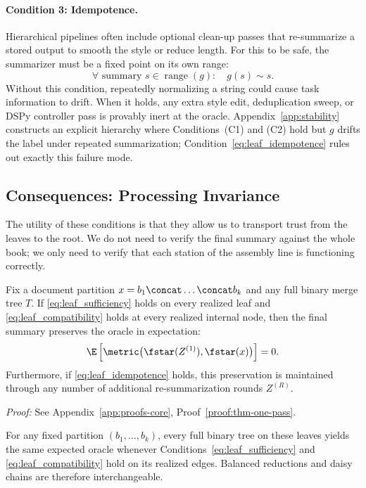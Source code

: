 \paragraph{Condition 3: Idempotence.}
Hierarchical pipelines often include optional clean-up passes that re-summarize a stored output to smooth the style or reduce length. For this to be safe, the summarizer must be a fixed point on its own range:
\begin{equation}\tag{C3}\label{eq:leaf_idempotence}
\forall \text{ summary } s \in \operatorname{range}(g):\quad g(s) \sim s.
\end{equation}
Without this condition, repeatedly normalizing a string could cause task information to drift. When it holds, any extra style edit, deduplication sweep, or DSPy controller pass is provably inert at the oracle. Appendix~\ref{app:stability} constructs an explicit hierarchy where Conditions~(C1) and (C2) hold but $g$ drifts the label under repeated summarization; Condition~\eqref{eq:leaf_idempotence} rules out exactly this failure mode.

\subsection{Consequences: Processing Invariance}

The utility of these conditions is that they allow us to transport trust from the leaves to the root. We do not need to verify the final summary against the whole book; we only need to verify that each station of the assembly line is functioning correctly.

\begin{theorem}\label{thm:one-pass}
Fix a document partition $x = b_1 \concat \dots \concat b_k$ and any full binary merge tree $T$. If \ref{eq:leaf_sufficiency} holds on every realized leaf and \ref{eq:leaf_compatibility} holds at every realized internal node, then the final summary preserves the oracle in expectation:
\[
\E\left[\metric\big(\fstar(Z^{(1)}), \fstar(x)\big)\right] = 0.
\]
Furthermore, if \ref{eq:leaf_idempotence} holds, this preservation is maintained through any number of additional re-summarization rounds $Z^{(R)}$.
\end{theorem}

\noindent\textit{Proof:} See Appendix~\ref{app:proofs-core}, Proof~\ref{proof:thm-one-pass}.

\begin{corollary}\label{cor:schedule}
For any fixed partition $(b_1, \ldots, b_k)$, every full binary tree on these leaves yields the same expected oracle whenever Conditions~\eqref{eq:leaf_sufficiency} and \eqref{eq:leaf_compatibility} hold on its realized edges. Balanced reductions and daisy chains are therefore interchangeable.
\end{corollary}

